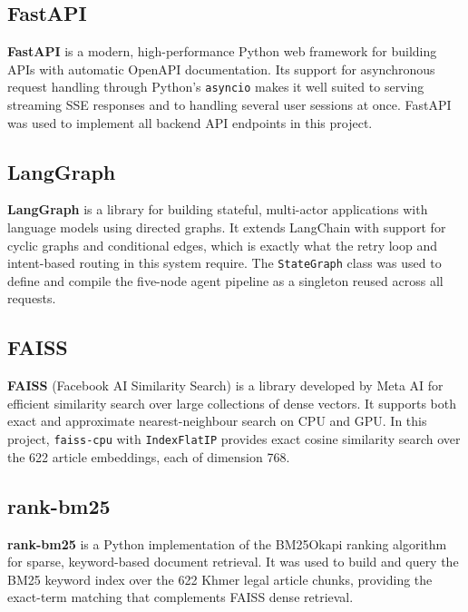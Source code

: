 \subsection{FastAPI}
\textbf{FastAPI} is a modern, high-performance Python web framework for building APIs with
automatic OpenAPI documentation. Its support for asynchronous request handling through
Python's \texttt{asyncio} makes it well suited to serving streaming SSE responses and to
handling several user sessions at once. FastAPI was used to implement all backend API
endpoints in this project.

\subsection{LangGraph}
\textbf{LangGraph} is a library for building stateful, multi-actor applications with
language models using directed graphs. It extends LangChain with support for cyclic
graphs and conditional edges, which is exactly what the retry loop and intent-based
routing in this system require. The \texttt{StateGraph} class was used to define and
compile the five-node agent pipeline as a singleton reused across all requests.

\newpage
\subsection{FAISS}
\textbf{FAISS} (Facebook AI Similarity Search) is a library developed by Meta AI for
efficient similarity search over large collections of dense vectors. It supports both
exact and approximate nearest-neighbour search on CPU and GPU. In this project,
\texttt{faiss-cpu} with \texttt{IndexFlatIP} provides exact cosine similarity search over
the 622 article embeddings, each of dimension 768.

\subsection{rank-bm25}
\textbf{rank-bm25} is a Python implementation of the BM25Okapi ranking algorithm for
sparse, keyword-based document retrieval. It was used to build and query the BM25 keyword
index over the 622 Khmer legal article chunks, providing the exact-term matching that
complements FAISS dense retrieval.

